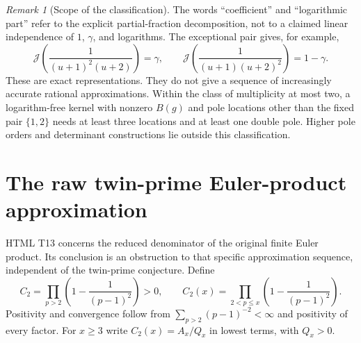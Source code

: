 \documentclass[11pt,a4paper]{article}
\theoremstyle{definition}\newtheorem{definition}[theorem]{Definition}
\theoremstyle{remark}\newtheorem{remark}[theorem]{Remark}
\begin{document}
\begin{remark}[Scope of the classification]\label{arith:rem:pole-scope}
The words ``coefficient'' and ``logarithmic part'' refer to the explicit
partial-fraction decomposition, not to a claimed linear independence
of $1$, $\gamma$, and logarithms.  The exceptional pair gives, for example,
\[
 \mathcal J\!\left(\frac1{(u+1)^2(u+2)}\right)=\gamma,
 \qquad
 \mathcal J\!\left(\frac1{(u+1)(u+2)^2}\right)=1-\gamma.
\]
These are exact representations.  They do not give a sequence of
increasingly accurate rational approximations.  Within the class of
multiplicity at most two, a logarithm-free kernel with nonzero
$B(g)$ and pole locations other than the fixed pair $\{1,2\}$ needs
at least three locations and at least one double pole.  Higher pole
orders and determinant constructions lie outside this classification.
\end{remark}

\section{The raw twin-prime Euler-product approximation}
\label{arith:sec:twin}

HTML T13 concerns the reduced denominator of the original finite Euler
product.  Its conclusion is an obstruction to that specific approximation
sequence, independent of the twin-prime conjecture.
Define
\[
 C_2=\prod_{p>2}\left(1-\frac1{(p-1)^2}\right)>0,
 \qquad C_2(x)=\prod_{2<p\le x}\left(1-\frac1{(p-1)^2}\right).
\]
Positivity and convergence follow from
$\sum_{p>2}(p-1)^{-2}<\infty$ and positivity of every factor.
For $x\ge3$ write $C_2(x)=A_x/Q_x$ in lowest terms, with $Q_x>0$.
\end{document}
